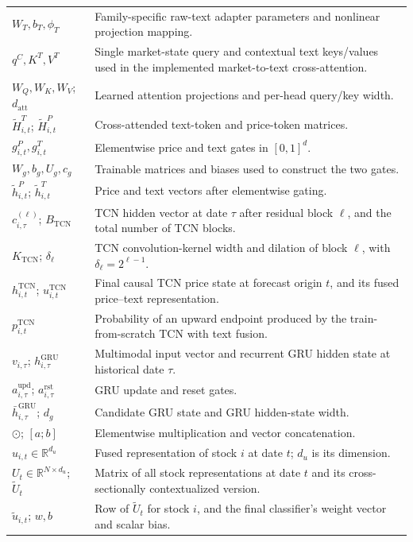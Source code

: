 \documentclass[11pt]{article}
\newcommand{\R}{\mathbb{R}}
\begin{document}
{\begin{longtable}{@{}p{}p{}@{}}
$W_T,b_T,\phi_T$ & Family-specific raw-text adapter parameters and nonlinear projection mapping. \\
$q^C,K^T,V^T$ & Single market-state query and contextual text keys/values used in the implemented market-to-text cross-attention. \\
$W_Q,W_K,W_V$; $d_{\mathrm{att}}$ & Learned attention projections and per-head query/key width. \\
$\widetilde H^T_{i,t}$; $\widetilde H^P_{i,t}$ & Cross-attended text-token and price-token matrices. \\
$g^P_{i,t},g^T_{i,t}$ & Elementwise price and text gates in $[0,1]^d$. \\
$W_g,b_g,U_g,c_g$ & Trainable matrices and biases used to construct the two gates. \\
$\widetilde h^P_{i,t}$; $\widetilde h^T_{i,t}$ & Price and text vectors after elementwise gating. \\
$c^{(\ell)}_{i,\tau}$; $B_{\mathrm{TCN}}$ & TCN hidden vector at date $\tau$ after residual block $\ell$, and the total number of TCN blocks. \\
$K_{\mathrm{TCN}}$; $\delta_\ell$ & TCN convolution-kernel width and dilation of block $\ell$, with $\delta_\ell=2^{\ell-1}$. \\
$h^{\mathrm{TCN}}_{i,t}$; $u^{\mathrm{TCN}}_{i,t}$ & Final causal TCN price state at forecast origin $t$, and its fused price--text representation. \\
$p^{\mathrm{TCN}}_{i,t}$ & Probability of an upward endpoint produced by the train-from-scratch TCN with text fusion. \\
$v_{i,\tau}$; $h^{\mathrm{GRU}}_{i,\tau}$ & Multimodal input vector and recurrent GRU hidden state at historical date $\tau$. \\
$a^{\mathrm{upd}}_{i,\tau}$; $a^{\mathrm{rst}}_{i,\tau}$ & GRU update and reset gates. \\
$\bar h^{\mathrm{GRU}}_{i,\tau}$; $d_g$ & Candidate GRU state and GRU hidden-state width. \\
$\odot$; $[a;b]$ & Elementwise multiplication and vector concatenation. \\
$u_{i,t}\in\R^{d_u}$ & Fused representation of stock $i$ at date $t$; $d_u$ is its dimension. \\
$U_t\in\R^{N\times d_u}$; $\widetilde U_t$ & Matrix of all stock representations at date $t$ and its cross-sectionally contextualized version. \\
$\widetilde u_{i,t}$; $w,b$ & Row of $\widetilde U_t$ for stock $i$, and the final classifier's weight vector and scalar bias. \\

\end{longtable}}
\end{document}
